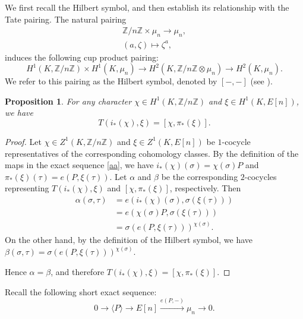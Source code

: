 \documentclass[11pt,a4paper]{amsart}
\newtheorem{proposition}[theorem]{Proposition}
\theoremstyle{definition}
\numberwithin{equation}{section}
\begin{document}
We first recall the Hilbert symbol, and then establish its relationship with the Tate pairing.
The natural pairing  
\begin{align*}
	\mathbb{Z}/n\mathbb{Z}\times \mu_n\rightarrow \mu_n,\\
	 (a,\zeta)\mapsto \zeta^a,
\end{align*}
induces the following cup product pairing:
\begin{equation*}
	H^1(K,\mathbb{Z}/n\mathbb{Z})\times H^1(K,\mu_n)\rightarrow H^2(K,\mathbb{Z}/n\mathbb{Z}\otimes \mu_n)\rightarrow H^2(K,\mu_n).
\end{equation*}
We refer to this pairing as the Hilbert symbol, denoted by $[-,-]$ (see \cite[Chapter XIV]{Serre}). 
\begin{proposition}\label{tate}
	For any character $\chi\in H^1(K,\mathbb{Z}/n\mathbb{Z})$ and $\xi \in H^1(K,E[n])$, we have 
	\begin{equation}
		T(i_*(\chi),\xi)=[\chi,\pi_*(\xi)].
	\end{equation}
\end{proposition}
\begin{proof}
	Let $\chi\in Z^1(K,\mathbb{Z}/n\mathbb{Z})$ and
	$\xi\in Z^1(K,E[n])$ be $1$-cocycle representatives of the
	corresponding cohomology classes. By the definition of the maps in the
	exact sequence \eqref{aa}, we have
	$
	i_*(\chi)(\sigma)=\chi(\sigma)P
	$
	and
	$
	\pi_*(\xi)(\tau)=e(P,\xi(\tau)).
	$
	Let $\alpha$ and $\beta$ be the corresponding $2$-cocycles
	representing $T(i_*(\chi),\xi)$ and $[\chi,\pi_*(\xi)]$,
	respectively. Then
	\begin{align*}
		\alpha(\sigma,\tau)
		&=e(i_*(\chi)(\sigma),\sigma(\xi(\tau)))\\
		&=e(\chi(\sigma)P,\sigma(\xi(\tau)))\\
		&=\sigma(e(P,\xi(\tau)))^{\chi(\sigma)}.
	\end{align*}
	On the other hand, by the definition of the Hilbert symbol, we have
	$
	\beta(\sigma,\tau)
	=\sigma(e(P,\xi(\tau)))^{\chi(\sigma)}.
	$
	
	
	Hence $\alpha=\beta$, and therefore $	T(i_*(\chi),\xi)=[\chi,\pi_*(\xi)].$
\end{proof}
 	Recall the following short exact sequence:
\begin{equation*}
	0\longrightarrow \langle P\rangle
	\longrightarrow E[n]
	\xrightarrow{e(P,-)}
	\mu_n
	\longrightarrow 0.
\end{equation*}
\end{document}
